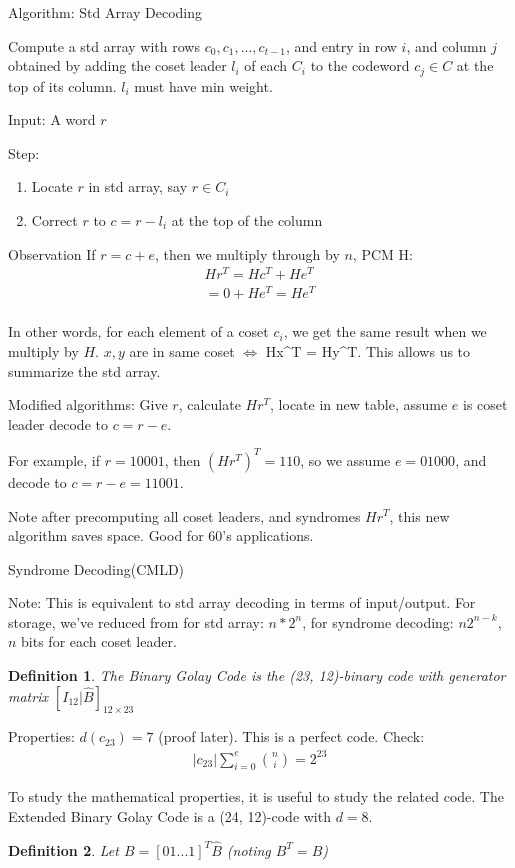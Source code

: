 \documentclass{article}
\newtheorem{defn}{Definition}
\begin{document}
Algorithm: Std Array Decoding

Compute a std array with rows $c_0, c_1, ..., c_{t-1}$, and entry in row $i$, and
column $j$ obtained by adding the coset leader $l_i$ of each $C_i$ to the codeword
$c_j\in C$ at the top of its column. $l_i$ must have min weight.

Input: A word $r$

Step:
\begin{enumerate}
    \item Locate $r$ in std array, say $r\in C_i$
    \item Correct $r$ to $c = r - l_i$ at the top of the column
\end{enumerate}

Observation If $r = c+e$, then we multiply through by $n$, PCM H:
\begin{align*}
    Hr^T = Hc^T + He^T\\
    = 0 + He^T = He^T\\
\end{align*}

In other words, for each element of a coset $c_i$, we get the same
result when we multiply by $H$.
$x,y$ are in same coset $\iff$ Hx^T = Hy^T.
This allows us to summarize the std array.

Modified algorithms: Give $r$, calculate $Hr^T$, locate in new table,
assume $e$ is coset leader decode to $c=r-e$.

For example, if $r = 10001$, then $(Hr^T)^T = 110$, so we assume
$e = 01000$, and decode to $c = r-e = 11001$.

Note after precomputing all coset leaders, and syndromes $Hr^T$,
this new algorithm saves space. Good for 60's applications.

Syndrome Decoding(CMLD)

Note: This is equivalent to std array decoding in terms of input/output. For
storage, we've reduced from for std array: $n*2^n$, for syndrome decoding:
$n2^{n-k}$, $n$ bits for each coset leader.

\begin{defn}
    The Binary Golay Code is the (23, 12)-binary code with generator matrix
    $[I_{12} | \hat{B}]_{12\times 23}$
\end{defn}
Properties: $d(c_{23}) = 7$ (proof later). This is a perfect code.
Check:
\begin{align*}
    |c_{23}|\sum_{i=0}^e \binom{n}{i} = 2^{23}
\end{align*}

To study the mathematical properties, it is useful to study the
related code. The Extended Binary Golay Code is a (24, 12)-code
with $d = 8$.
\begin{defn}
    Let $B = [0 1 ... 1]^T\hat{B}$ (noting $B^T = B$)
\end{defn}
\end{document}
